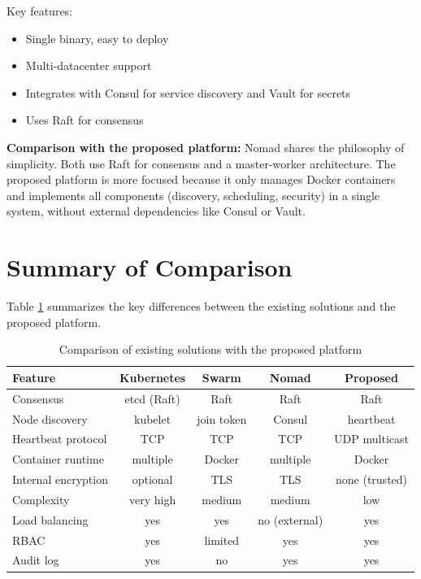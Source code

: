 Key features:
\begin{itemize}
    \item Single binary, easy to deploy
    \item Multi-datacenter support
    \item Integrates with Consul for service discovery and Vault for secrets
    \item Uses Raft for consensus
\end{itemize}

\textbf{Comparison with the proposed platform:} Nomad shares the philosophy of simplicity. Both use Raft for consensus and a master-worker architecture. The proposed platform is more focused because it only manages Docker containers and implements all components (discovery, scheduling, security) in a single system, without external dependencies like Consul or Vault.

\section{Summary of Comparison}

Table \ref{tab:comparison} summarizes the key differences between the existing solutions and the proposed platform.

\begin{table}[H]
    \centering
    \caption{Comparison of existing solutions with the proposed platform}
    \label{tab:comparison}
    \begin{tabular}{|l|c|c|c|c|}
        \hline
        \textbf{Feature} & \textbf{Kubernetes} & \textbf{Swarm} & \textbf{Nomad} & \textbf{Proposed} \\
        \hline
        Consensus & etcd (Raft) & Raft & Raft & Raft \\
        \hline
        Node discovery & kubelet & join token & Consul & heartbeat \\
        \hline
        Heartbeat protocol & TCP & TCP & TCP & UDP multicast \\
        \hline
        Container runtime & multiple & Docker & multiple & Docker \\
        \hline
        Internal encryption & optional & TLS & TLS & none (trusted) \\
        \hline
        Complexity & very high & medium & medium & low \\
        \hline
        Load balancing & yes & yes & no (external) & yes \\
        \hline
        RBAC & yes & limited & yes & yes \\
        \hline
        Audit log & yes & no & yes & yes \\
        \hline
    \end{tabular}
\end{table}

